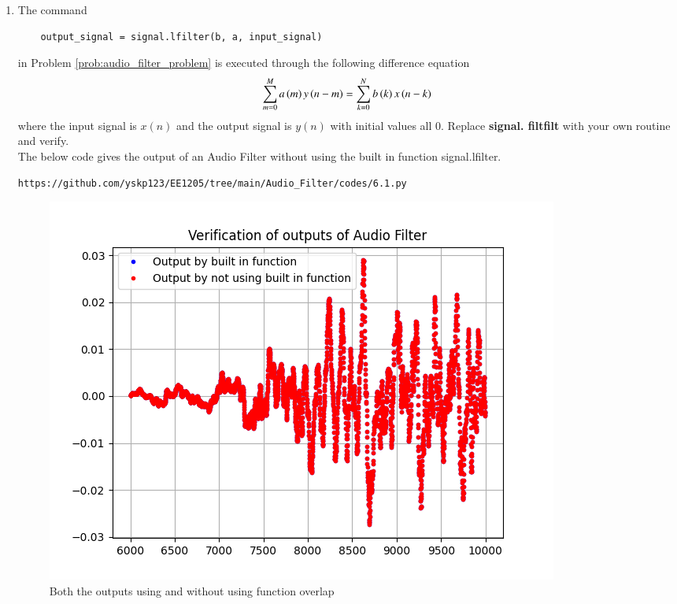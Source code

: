 \documentclass[journal,12pt,twocolumn]{IEEEtran}
\theoremstyle{remark}
\begin{document}
\begin{enumerate}[label=\thesection.\arabic*]
\item
The command
\begin{lstlisting}
	output_signal = signal.lfilter(b, a, input_signal)
	\end{lstlisting}
in Problem \ref{prob:audio_filter_problem} is executed through the following difference equation
\begin{equation}
\label{eq:iir_filter_gen}
 \sum _{m=0}^{M}a\left(m\right)y\left(n-m\right)=\sum _{k=0}^{N}b\left(k\right)x\left(n-k\right) 
\end{equation}
%
where the input signal is $x(n)$ and the output signal is $y(n)$ with initial values all 0. Replace
\textbf{signal. filtfilt} with your own routine and verify.\\

\solution The below code gives the output of an Audio Filter without using the built in function signal.lfilter.
\begin{lstlisting}
https://github.com/yskp123/EE1205/tree/main/Audio_Filter/codes/6.1.py 
\end{lstlisting}
\begin{figure}[H]
\centering
\includegraphics[width=\columnwidth]{figs/Audio_Filter_verf.png}
\caption{Both the outputs using and without using function overlap}
\label{fig:6.1}
\end{figure}






\end{enumerate}
\end{document}
